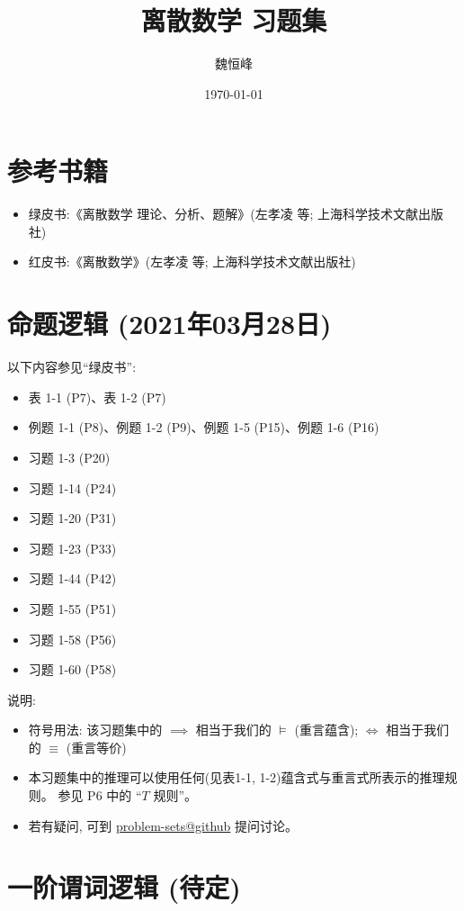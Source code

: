 \documentclass{article}
\title{离散数学 习题集}
\author{魏恒峰}
\date{\today}
\begin{document}
\maketitle
\section{参考书籍}

\begin{itemize}
  \item 绿皮书:《离散数学 理论、分析、题解》(左孝凌 等; 上海科学技术文献出版社)
  \item 红皮书:《离散数学》(左孝凌 等; 上海科学技术文献出版社)
\end{itemize}
\section{命题逻辑 (2021年03月28日)}

以下内容参见``绿皮书'':
\begin{itemize}
  \item 表 1-1 (P7)、表 1-2 (P7)
  \item 例题 1-1 (P8)、例题 1-2 (P9)、例题 1-5 (P15)、例题 1-6 (P16)
  \item 习题 1-3 (P20)
  \item 习题 1-14 (P24)
  \item 习题 1-20 (P31)
  \item 习题 1-23 (P33)
  \item 习题 1-44 (P42)
  \item 习题 1-55 (P51)
  \item 习题 1-58 (P56)
  \item 习题 1-60 (P58)
\end{itemize}

说明:
\begin{itemize}
  \item 符号用法: 该习题集中的 $\implies$ 相当于我们的 $\models$ (重言蕴含);
    $\iff$ 相当于我们的 $\equiv$ (重言等价)
  \item 本习题集中的推理可以使用任何(见表1-1, 1-2)蕴含式与重言式所表示的推理规则。
    参见 P6 中的 ``$T$ 规则''。
  \item 若有疑问, 可到 \href{https://github.com/courses-at-nju-by-hfwei/discrete-math-problem-sets/discussions}{problem-sets@github} 提问讨论。
\end{itemize}

\section{一阶谓词逻辑 (待定)}
\end{document}
